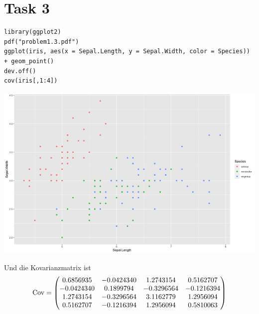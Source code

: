 \documentclass{article}
\DeclareMathOperator{\Cov}{Cov}
\begin{document}
	\section*{Task 3}
	\begin{lstlisting}
library(ggplot2)
pdf("problem1.3.pdf")
ggplot(iris, aes(x = Sepal.Length, y = Sepal.Width, color = Species)) + geom_point()
dev.off()
cov(iris[,1:4])
	\end{lstlisting}
	\begin{center}
		\includegraphics[scale=0.3]{1_3_scatterplot}
	\end{center}
	Und die Kovarianzmatrix ist
	\begin{align}
		\Cov = \begin{pmatrix}
			0.6856935 & -0.0424340 & 1.2743154 & 0.5162707 \\
			-0.0424340 & 0.1899794 & -0.3296564 & -0.1216394 \\
			1.2743154 & -0.3296564 & 3.1162779 & 1.2956094 \\
			0.5162707 & -0.1216394 & 1.2956094 & 0.5810063
		\end{pmatrix} \notag
	\end{align}
	
\end{document}
